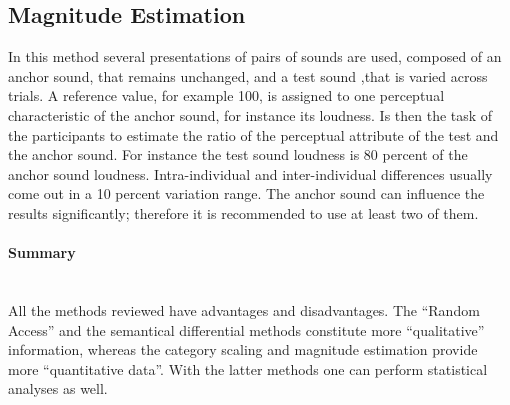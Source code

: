 \subsection{Magnitude Estimation}

In this method several presentations of pairs of sounds are used, composed of an
anchor sound, that remains unchanged, and a test sound ,that is varied across
trials. A reference value, for example 100, is assigned to one perceptual
characteristic of the anchor sound, for instance its loudness. Is then the task
of the participants to estimate the ratio of the perceptual attribute of the
test and the anchor sound. For instance the test sound loudness is 80 percent of
the anchor sound loudness. Intra-individual and inter-individual differences
usually come out in a 10 percent variation range. The anchor sound can influence
the results significantly; therefore it is recommended to use at least two of
them.

\paragraph{Summary} ~\\
All the methods reviewed have advantages and disadvantages. The ``Random
Access'' and the semantical differential methods constitute more ``qualitative''
information, whereas the category scaling and magnitude estimation provide more
``quantitative data''. With the latter methods one can perform statistical
analyses as well.
